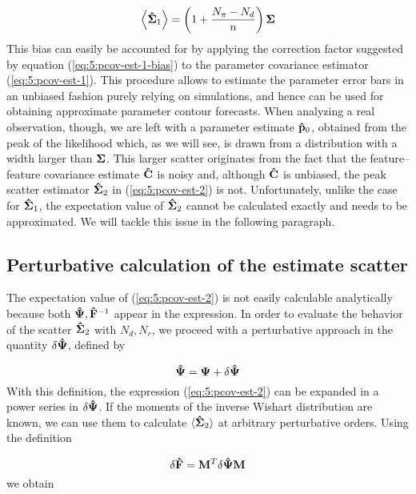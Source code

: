 \begin{equation}
\label{eq:5:pcov-est-1-bias}
\left\langle\mathbf{\hat{\Sigma}}_1\right\rangle = \left(1+\frac{N_\pi-N_d}{n}\right)\mathbf{\Sigma}
\end{equation}
%
This bias can easily be accounted for by applying the correction factor suggested by equation (\ref{eq:5:pcov-est-1-bias}) to the parameter covariance estimator (\ref{eq:5:pcov-est-1}). This procedure allows to estimate the parameter error bars in an unbiased fashion purely relying on simulations, and hence can be used for obtaining approximate parameter contour forecasts. When analyzing a real observation, though, we are left with a parameter estimate $\mathbf{\hat{p}}_0$, obtained from the peak of the likelihood which, as we will see, is drawn from a distribution with a width larger than $\mathbf{\Sigma}$. This larger scatter originates from the fact that the feature--feature covariance estimate $\mathbf{\hat{C}}$ is noisy and, although $\mathbf{\hat{C}}$ is unbiased, the peak scatter estimator $\mathbf{\hat{\Sigma}}_2$ in (\ref{eq:5:pcov-est-2}) is not. Unfortunately, unlike the case for $\mathbf{\hat{\Sigma}}_1$, the expectation value of $\mathbf{\hat{\Sigma}}_2$ cannot be calculated exactly and needs to be approximated. We will tackle this issue in the following paragraph.  

\subsection{Perturbative calculation of the estimate scatter}
The expectation value of (\ref{eq:5:pcov-est-2}) is not easily calculable analytically because both $\mathbf{\hat{\Psi}},\mathbf{\hat{F}}^{-1}$ appear in the expression. In order to evaluate the behavior of the scatter $\mathbf{\hat{\Sigma}}_2$ with $N_d,N_r$, we proceed with a perturbative approach in the quantity $\delta\mathbf{\hat{\Psi}}$, defined by

\begin{equation}
\label{eq:5:deltapsi}
\mathbf{\hat{\Psi}} = \mathbf{\Psi} + \delta\mathbf{\hat{\Psi}}
\end{equation}
%
With this definition, the expression (\ref{eq:5:pcov-est-2}) can be expanded in a power series in $\delta\mathbf{\hat{\Psi}}$. If the moments of the inverse Wishart distribution are known, we can use them to calculate $\langle\mathbf{\hat{\Sigma}}_2\rangle$ at arbitrary perturbative orders. Using the definition

\begin{equation}
\label{eq:5:deltaF}
\delta\mathbf{\hat{F}} = \mathbf{M}^T\delta\mathbf{\hat{\Psi}}\mathbf{M}
\end{equation}
%
we obtain

